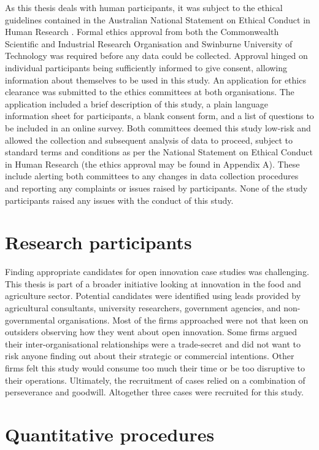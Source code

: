As this thesis deals with human participants, it was subject to the ethical guidelines contained in the Australian National Statement on Ethical Conduct in Human Research \citep{national2007national}. Formal ethics approval from both the Commonwealth Scientific and Industrial Research Organisation and Swinburne University of Technology was required before any data could be collected. Approval hinged on individual participants being sufficiently informed to give consent, allowing information about themselves to be used in this study. An application for ethics clearance was submitted to the ethics committees at both organisations. The application included a brief description of this study, a plain language information sheet for participants, a blank consent form, and a list of questions to be included in an online survey. Both committees deemed this study low-risk and allowed the collection and subsequent analysis of data to proceed, subject to standard terms and conditions as per the National Statement on Ethical Conduct in Human Research (the ethics approval may be found in Appendix A). These include alerting both committees to any changes in data collection procedures and reporting any complaints or issues raised by participants. None of the study participants raised any issues with the conduct of this study. 

\section{Research participants}

Finding appropriate candidates for open innovation case studies was challenging. This thesis is part of a broader initiative looking at innovation in the food and agriculture sector. Potential candidates were identified using leads provided by agricultural consultants, university researchers, government agencies, and non-governmental organisations. Most of the firms approached were not that keen on outsiders observing how they went about open innovation. Some firms argued their inter-organisational relationships were a trade-secret and did not want to risk anyone finding out about their strategic or commercial intentions. Other firms felt this study would consume too much their time or be too disruptive to their operations. Ultimately, the recruitment of cases relied on a combination of perseverance and goodwill. Altogether three cases were recruited for this study. 

\section{Quantitative procedures}

